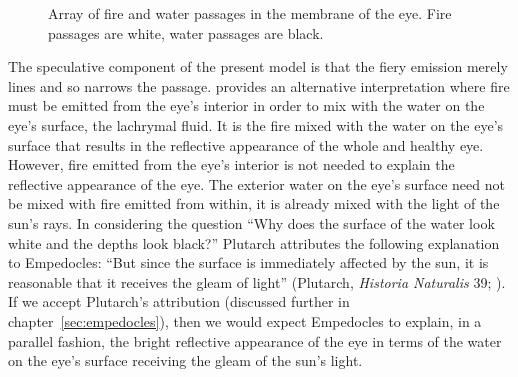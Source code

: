 \begin{figure}[ht]
    \begin{center}
    \end{center}
    \caption{Array of fire and water passages in the membrane of the eye. Fire passages are white, water passages are black.}
    \label{fig:1}
\end{figure}

The speculative component of the present model is that the fiery emission merely lines and so narrows the passage. \citet{Sedley:1992uq} provides an alternative interpretation where fire must be emitted from the eye's interior in order to mix with the water on the eye's surface, the lachrymal fluid. It is the fire mixed with the water on the eye's surface that results in the reflective appearance of the whole and healthy eye. However, fire emitted from the eye's interior is not needed to explain the reflective appearance of the eye. The exterior water on the eye's surface need not be mixed with fire emitted from within, it is already mixed with the light of the sun's rays. In considering the question ``Why does the surface of the water look white and the depths look black?'' Plutarch attributes the following explanation to Empedocles: ``But since the surface is immediately affected by the sun, it is reasonable that it receives the gleam of light''  (Plutarch, \emph{Historia Naturalis} 39; \citealt[\textsc{ctxt}-87 137--138]{Inwood:2001ve}). If we accept Plutarch's attribution (discussed further in chapter~\ref{sec:empedocles}), then we would expect Empedocles to explain, in a parallel fashion, the bright reflective appearance of the eye in terms of the water on the eye's surface receiving the gleam of the sun's light.

